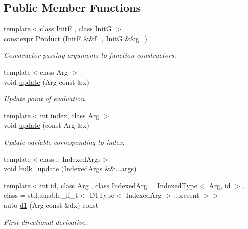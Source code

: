 \subsection*{Public Member Functions}
\begin{DoxyCompactItemize}
\item 
{\footnotesize template$<$class InitF , class InitG $>$ }\\constexpr \hyperlink{structFunG_1_1MathematicalOperations_1_1Product_aa8cfd39987b88daf172a42cc7a273535}{Product} (InitF \&\&f\+\_\+, InitG \&\&g\+\_\+)
\begin{DoxyCompactList}\small\item\em Constructor passing arguments to function constructors. \end{DoxyCompactList}\item 
{\footnotesize template$<$class Arg $>$ }\\void \hyperlink{structFunG_1_1MathematicalOperations_1_1Product_a5b45c1bac06651ee5b6ea79fb5128ef9}{update} (Arg const \&x)
\begin{DoxyCompactList}\small\item\em Update point of evaluation. \end{DoxyCompactList}\item 
{\footnotesize template$<$int index, class Arg $>$ }\\void \hyperlink{structFunG_1_1MathematicalOperations_1_1Product_a8db3d935bbe273c0436ff3bc6bb6b786}{update} (const Arg \&x)
\begin{DoxyCompactList}\small\item\em Update variable corresponding to index. \end{DoxyCompactList}\item 
{\footnotesize template$<$class... Indexed\+Args$>$ }\\void \hyperlink{structFunG_1_1MathematicalOperations_1_1Product_af35c22f2ac30fc5af8e91c15a9248902}{bulk\+\_\+update} (Indexed\+Args \&\&...args)
\item 
{\footnotesize template$<$int id, class Arg , class Indexed\+Arg  = Indexed\+Type$<$ Arg, id $>$, class  = std\+::enable\+\_\+if\+\_\+t$<$ D1\+Type$<$ Indexed\+Arg $>$\+::present $>$$>$ }\\auto \hyperlink{structFunG_1_1MathematicalOperations_1_1Product_aea69feaac16f79717a85d7b089a80f8f}{d1} (Arg const \&dx) const 
\begin{DoxyCompactList}\small\item\em First directional derivative. \end{DoxyCompactList}\item 

\end{DoxyCompactItemize}
